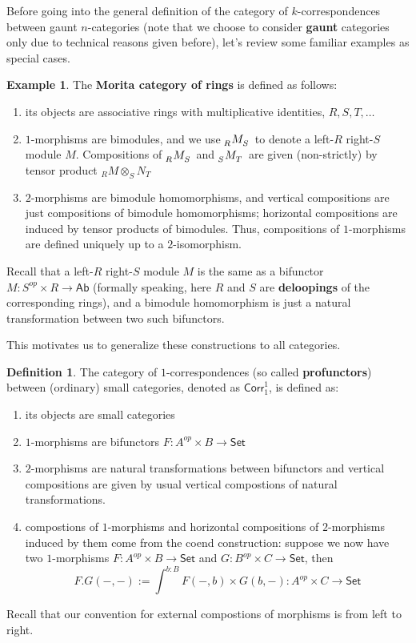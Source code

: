 \documentclass{article}
\theoremstyle{definition}
\newtheorem{mydef}{Definition}[section]
\newtheorem*{eg}{Example}
\theoremstyle{remark}
\begin{document}
Before going into the general definition of the category of $k$-correspondences between gaunt $n$-categories (note that we choose to consider \textbf{gaunt} categories only due to technical reasons given before), let's review some familiar examples as special cases.

\begin{eg}
The \textbf{Morita category of rings} is defined as follows: 
\begin{enumerate}
    \item its objects are associative rings with multiplicative identities, $R,S,T,\dots$
    \item $1$-morphisms are bimodules, and we use $\tensor[_R]{M}{_S}$ to denote a left-$R$ right-$S$ module $M$. Compositions of $\tensor[_R]{M}{_S}$ and $\tensor[_S]{M}{_T}$ are given (non-strictly) by tensor product ${}_R M \otimes_S N_T$
    \item $2$-morphisms are bimodule homomorphisms, and vertical compositions are just compositions of bimodule homomorphisms; horizontal compositions are induced by tensor products of bimodules. Thus, compositions of $1$-morphisms are defined uniquely up to a $2$-isomorphism.
\end{enumerate} 

Recall that a left-$R$ right-$S$ module $M$ is the same as a bifunctor $M:S^{op} \times R \to \mathsf{Ab}$ (formally speaking, here $R$ and $S$ are \textbf{deloopings} of the corresponding rings), and a bimodule homomorphism is just a natural transformation between two such bifunctors.
\end{eg}

This motivates us to generalize these constructions to all categories.

\begin{mydef}
The category of $1$-correspondences (so called \textbf{profunctors}) between (ordinary) small categories, denoted as $\mathsf{Corr}_1^1$, is defined as:
\begin{enumerate}
    \item its objects are small categories
    \item $1$-morphisms are bifunctors $F:A^{op}\times B \to \mathsf{Set}$
    \item $2$-morphisms are natural transformations between bifunctors and vertical compositions are given by usual vertical compostions of natural transformations.
    \item compostions of $1$-morphisms and horizontal compositions of $2$-morphisms induced by them come from the coend construction: suppose we now have two $1$-morphisms $F:A^{op}\times B \to \mathsf{Set}$ and $G:B^{op}\times C \to \mathsf{Set}$, then $$ F.G(-,-) := \int^{b:B}{F(-,b) \times G(b,-)}:A^{op}\times C \to \mathsf{Set} $$
\end{enumerate}
Recall that our convention for external compostions of morphisms is from left to right.
\end{mydef}
\end{document}
